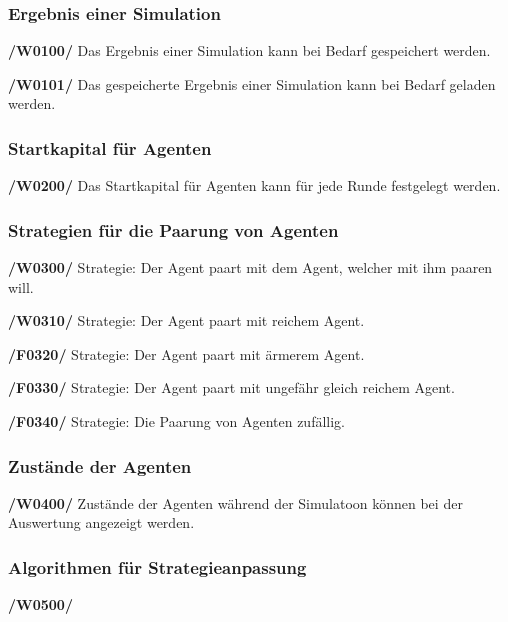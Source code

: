\subsubsection{Ergebnis einer Simulation}

\textbf{/W0100/}
Das Ergebnis einer Simulation kann bei Bedarf gespeichert werden.

\textbf{/W0101/}
Das gespeicherte Ergebnis einer Simulation kann bei Bedarf geladen werden.

\subsubsection{Startkapital für Agenten}

\textbf{/W0200/}
Das Startkapital für Agenten kann für jede Runde festgelegt werden.

\subsubsection{Strategien für die Paarung von Agenten}

\textbf{/W0300/}
Strategie: Der Agent paart mit dem Agent, welcher mit ihm paaren will.

\textbf{/W0310/} 
Strategie: Der Agent paart mit reichem Agent.

\textbf{/F0320/}
Strategie: Der Agent paart mit ärmerem Agent.

\textbf{/F0330/}
Strategie: Der Agent paart mit ungefähr gleich reichem Agent.

\textbf{/F0340/}
Strategie: Die Paarung von Agenten  zufällig.

\subsubsection{Zustände der Agenten}

\textbf{/W0400/}
Zustände der Agenten während der Simulatoon können bei der Auswertung angezeigt werden.

\subsubsection{Algorithmen für Strategieanpassung}

\textbf{/W0500/}
